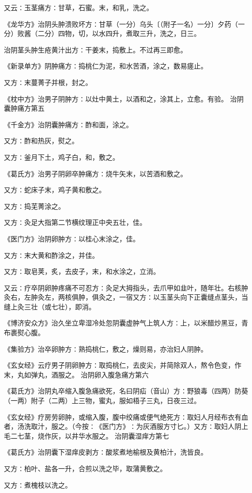 \documentclass[a4paper,12pt,UTF8,twoside]{ctexbook}
\begin{document}
又云∶玉茎痛方∶甘草，石蜜。末，和乳，洗之。

《龙华方》治阴头肿溃败坏方∶甘草（一分）乌头〔（附子一名）一分〕夕药（一分）败酱（二分）四物，切，以水四升，煮取三升，洗之，日三。

治阴茎头肿生疮黄汁出方∶干姜末，捣敷上。不过再三即愈。

《新录单方》阴肿痛方∶捣桃仁为泥，和水苦酒，涂之，数易瘥止。

又方∶末蔓菁子并根，封之。

《枕中方》治男子阴肿方∶以灶中黄土，以酒和之，涂其上，立愈。有验。
治阴囊肿痛方第五

《千金方》治阴囊肿痛方∶酢和面，涂之。

又方∶酢和热灰，熨之。

又方∶釜月下土，鸡子白，和，敷之。

《葛氏方》治男子阴卵卒肿痛方∶烧牛矢末，以苦酒和敷之。

又方∶蛇床子末，鸡子黄和敷之。

又方∶捣芜菁涂之。

又方∶灸足大指第二节横纹理正中央五壮，佳。

《医门方》治阴卵肿方∶以桂心末涂之，佳。

又方∶末大黄和酢涂之，并佳。

又方∶取皂荚，炙，去皮子，末，和水涂之，立消。

又云∶疗卒阴卵肿疼痛不可忍方∶灸足大拇指头，去爪甲如韭叶，随年壮。右核肿灸右，左肿灸左，两核俱肿，俱灸之，一宿又方∶以玉茎头向下正囊缝点茎头，当缝上灸三壮（或七壮），即消。

《博济安众方》治久坐立卑湿冷处忽阴囊虚肿气上筑人方∶上，以米醋炒黑豆，青布裹熨心腹。

《集验方》治卒卵肿方∶熟捣桃仁，敷之，燥则易，亦治妇人阴肿。

《玄女经》云疗男子阴卵肿方∶取捣桃仁，去皮尖，并简除双人，熬令色变，作末，丸如弹丸，酒服之。
治阴卵入腹急痛方第六

《葛氏方》治阴丸卒缩入腹急痛欲死，名曰阴疝（音山）方∶野狼毒（四两）防葵（一两）附子（二两）上三物，蜜丸，服如梧子三丸，日夜三过。

《玄女经》疗房劳卵肿，或缩入腹，腹中绞痛或便气绝死方∶取妇人月经布衣有血者，汤洗取汁，服之。（今按∶《医门方》∶为灰酒服方寸匕。）又方∶取妇人阴上毛二七茎，烧作灰，以井华水服之。
治阴囊湿痒方第七

《葛氏方》治阴囊下湿痒皮剥方∶酸浆煮地榆根及黄柏汁，洗皆良。

又方∶柏叶、盐各一升，合煎以洗之毕，取蒲黄敷之。

又方∶煮槐枝以洗之。
\end{document}

